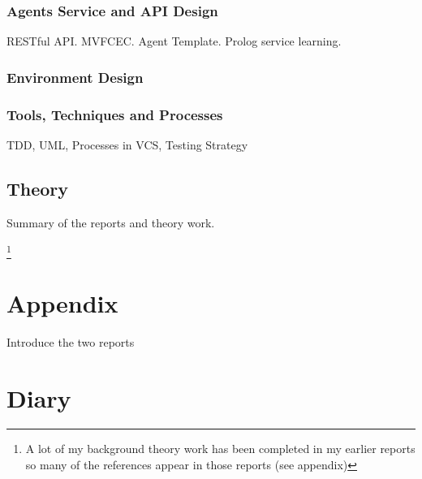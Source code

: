 \documentclass[]{final_report}
\begin{document}
\subsection{Agents Service and API Design}
RESTful API. MVFCEC. Agent Template. Prolog service learning.

\subsection{Environment Design}

\subsection{Tools, Techniques and Processes}

TDD, UML, Processes in VCS, Testing Strategy

\section{Theory}
Summary of the reports and theory work.

\newpage
{}

\footnote{A lot of my background theory work has been completed in my earlier reports so many of the references appear in those reports (see appendix)}
\label{endpage}

\chapter{Appendix}
Introduce the two reports





\chapter{Diary}
\end{document}
